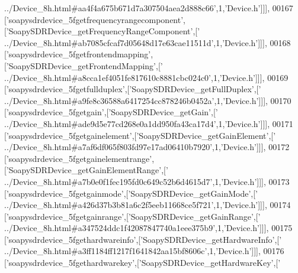 \begin{DoxyCode}
{      ../Device\_8h.html#aa4f4a675b671d7a307504aea2d888c66'},1,\textcolor{stringliteral}{'Device.h'}]]],
00167   [\textcolor{stringliteral}{'soapysdrdevice\_5fgetfrequencyrangecomponent'},[\textcolor{stringliteral}{'SoapySDRDevice\_getFrequencyRangeComponent'},[\textcolor{stringliteral}{'
      ../Device\_8h.html#ab7085cfcaf7d05648d17e63cae11511d'},1,\textcolor{stringliteral}{'Device.h'}]]],
00168   [\textcolor{stringliteral}{'soapysdrdevice\_5fgetfrontendmapping'},[\textcolor{stringliteral}{'SoapySDRDevice\_getFrontendMapping'},[\textcolor{stringliteral}{'
      ../Device\_8h.html#a8cca1ef4051fe817610c8881cbc024c0'},1,\textcolor{stringliteral}{'Device.h'}]]],
00169   [\textcolor{stringliteral}{'soapysdrdevice\_5fgetfullduplex'},[\textcolor{stringliteral}{'SoapySDRDevice\_getFullDuplex'},[\textcolor{stringliteral}{'
      ../Device\_8h.html#a9fe8c36588a6417254cc878246b0452a'},1,\textcolor{stringliteral}{'Device.h'}]]],
00170   [\textcolor{stringliteral}{'soapysdrdevice\_5fgetgain'},[\textcolor{stringliteral}{'SoapySDRDevice\_getGain'},[\textcolor{stringliteral}{'
      ../Device\_8h.html#ade9d5e77cd268e0a1dd950fa43ca17d4'},1,\textcolor{stringliteral}{'Device.h'}]]],
00171   [\textcolor{stringliteral}{'soapysdrdevice\_5fgetgainelement'},[\textcolor{stringliteral}{'SoapySDRDevice\_getGainElement'},[\textcolor{stringliteral}{'
      ../Device\_8h.html#a7af6df065f803fd97e17ad06410b7920'},1,\textcolor{stringliteral}{'Device.h'}]]],
00172   [\textcolor{stringliteral}{'soapysdrdevice\_5fgetgainelementrange'},[\textcolor{stringliteral}{'SoapySDRDevice\_getGainElementRange'},[\textcolor{stringliteral}{'
      ../Device\_8h.html#a7b0e0f1fec195fd0c649c52b6d4615d7'},1,\textcolor{stringliteral}{'Device.h'}]]],
00173   [\textcolor{stringliteral}{'soapysdrdevice\_5fgetgainmode'},[\textcolor{stringliteral}{'SoapySDRDevice\_getGainMode'},[\textcolor{stringliteral}{'
      ../Device\_8h.html#a426d37b3b81a6c2f5eeb11668ce5f721'},1,\textcolor{stringliteral}{'Device.h'}]]],
00174   [\textcolor{stringliteral}{'soapysdrdevice\_5fgetgainrange'},[\textcolor{stringliteral}{'SoapySDRDevice\_getGainRange'},[\textcolor{stringliteral}{'
      ../Device\_8h.html#a347524ddc1f42087847740a1eee375b9'},1,\textcolor{stringliteral}{'Device.h'}]]],
00175   [\textcolor{stringliteral}{'soapysdrdevice\_5fgethardwareinfo'},[\textcolor{stringliteral}{'SoapySDRDevice\_getHardwareInfo'},[\textcolor{stringliteral}{'
      ../Device\_8h.html#a3ff1184ff1217f1641842aa15bf8606c'},1,\textcolor{stringliteral}{'Device.h'}]]],
00176   [\textcolor{stringliteral}{'soapysdrdevice\_5fgethardwarekey'},[\textcolor{stringliteral}{'SoapySDRDevice\_getHardwareKey'},[\textcolor{stringliteral}{'
}
\end{DoxyCode}
